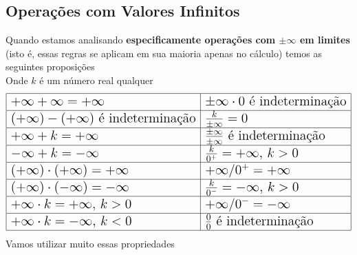 \documentclass{article}
\begin{document}
\subsection{Operações com Valores Infinitos}
Quando estamos analisando \textbf{especificamente operações com $\pm\infty$ em limites} (isto é, essas regras se aplicam em sua maioria apenas no cálculo) temos as seguintes proposições\\[10pt]
Onde $k$ é um número real qualquer
\[
\Large
\begin{array}{|l|l|}
\hline
+ \infty + \infty = + \infty & \pm \infty \cdot 0 \text{ é indeterminação} \\ \hline
(+ \infty) - (+ \infty) \text{ é indeterminação} & \frac{k}{\pm \infty} = 0 \\ \hline
+ \infty + k = + \infty & \frac{\pm \infty}{\pm \infty} \text{ é indeterminação} \\ \hline
- \infty + k = - \infty & \frac{k}{0^+} = + \infty, \, k > 0 \\ \hline
(+ \infty) \cdot (+ \infty) = + \infty & + \infty / 0^+ = + \infty \\ \hline
(+ \infty) \cdot (- \infty) = - \infty & \frac{k}{0^-} = - \infty, \, k > 0 \\ \hline
+ \infty \cdot k = + \infty, \, k > 0 & + \infty / 0^- = - \infty \\ \hline
+ \infty \cdot k = - \infty, \, k < 0 & \frac{0}{0} \text{ é indeterminação} \\ \hline
\end{array}
\]
Vamos utilizar muito essas propriedades
\end{document}
